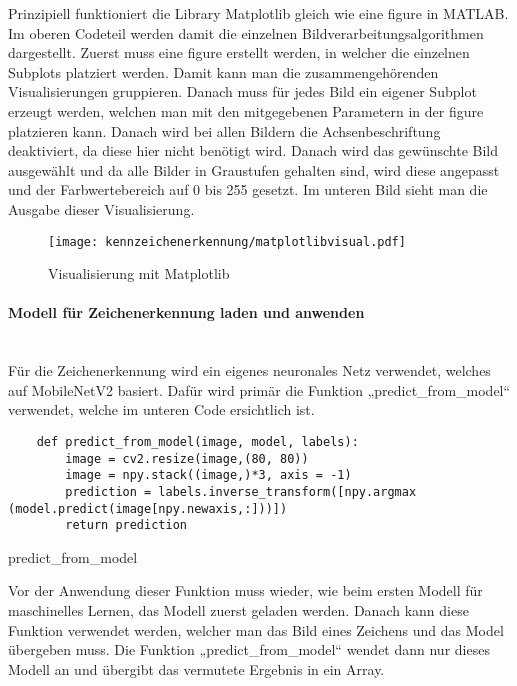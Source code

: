 Prinzipiell funktioniert die Library Matplotlib gleich wie eine figure in MATLAB. Im oberen Codeteil werden damit die einzelnen Bildverarbeitungsalgorithmen 
dargestellt. Zuerst muss eine figure erstellt werden, in welcher die einzelnen Subplots platziert werden. Damit kann man die zusammengehörenden Visualisierungen 
gruppieren. Danach muss für jedes Bild ein eigener Subplot erzeugt werden, welchen man mit den mitgegebenen Parametern in der figure platzieren kann. Danach 
wird bei allen Bildern die Achsenbeschriftung deaktiviert, da diese hier nicht benötigt wird. Danach wird das gewünschte Bild ausgewählt und da alle Bilder in 
Graustufen gehalten sind, wird diese angepasst und der Farbwertebereich auf 0 bis 255 gesetzt. Im unteren Bild sieht man die Ausgabe dieser Visualisierung.

\begin{figure}[H]
    \centering
    \texttt{[image: kennzeichenerkennung/matplotlibvisual.pdf]}
    \caption{Visualisierung mit Matplotlib}
\end{figure}

\paragraph{Modell für Zeichenerkennung laden und anwenden}\mbox{}\\

Für die Zeichenerkennung wird ein eigenes neuronales Netz verwendet, welches auf MobileNetV2 basiert. Dafür wird primär die Funktion „predict{\_}from{\_}model“ 
verwendet, welche im unteren Code ersichtlich ist.

\begin{listing}[H]
    \begin{verbatim}
    def predict_from_model(image, model, labels):
        image = cv2.resize(image,(80, 80))
        image = npy.stack((image,)*3, axis = -1)
        prediction = labels.inverse_transform([npy.argmax (model.predict(image[npy.newaxis,:]))])
        return prediction
    \end{verbatim}
    \caption{predict{\_}from{\_}model}
\end{listing}

Vor der Anwendung dieser Funktion muss wieder, wie beim ersten Modell für maschinelles Lernen, das Modell zuerst geladen werden. Danach kann diese Funktion verwendet werden, 
welcher man das Bild eines Zeichens und das Model übergeben muss. Die Funktion „predict{\_}from{\_}model“ wendet dann nur dieses Modell an und übergibt das 
vermutete Ergebnis in ein Array.


